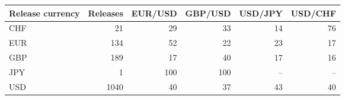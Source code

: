 \begin{tabular}{lrrrrr}
\toprule
Release currency & Releases & EUR/USD & GBP/USD & USD/JPY & USD/CHF \\
\midrule
CHF & 21 & 29 & 33 & 14 & 76 \\
EUR & 134 & 52 & 22 & 23 & 17 \\
GBP & 189 & 17 & 40 & 17 & 16 \\
JPY & 1 & 100 & 100 & -- & -- \\
USD & 1040 & 40 & 37 & 43 & 40 \\
\bottomrule
\end{tabular}
